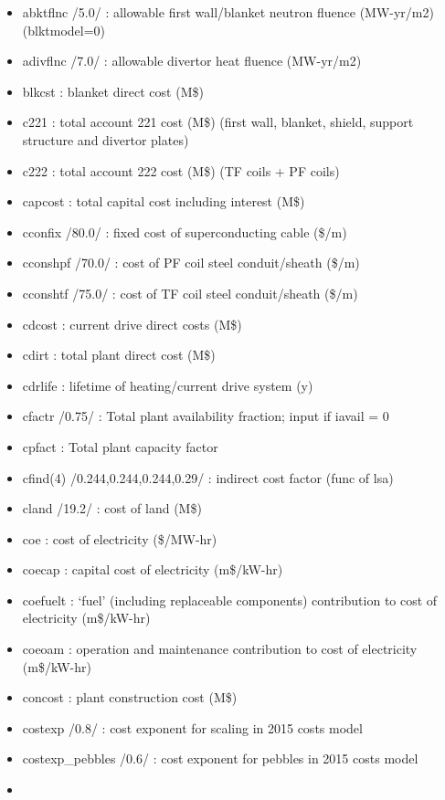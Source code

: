 \documentclass[]{article}
\begin{document}
\begin{itemize}
\itemsep1pt\parskip0pt
\item
  abktflnc /5.0/ : allowable first wall/blanket neutron fluence
  (MW-yr/m2) (blktmodel=0)
\item
  adivflnc /7.0/ : allowable divertor heat fluence (MW-yr/m2)
\item
  blkcst : blanket direct cost (M\$)
\item
  c221 : total account 221 cost (M\$) (first wall, blanket, shield,
  support structure and divertor plates)
\item
  c222 : total account 222 cost (M\$) (TF coils + PF coils)
\item
  capcost : total capital cost including interest (M\$)
\item
  cconfix /80.0/ : fixed cost of superconducting cable (\$/m)
\item
  cconshpf /70.0/ : cost of PF coil steel conduit/sheath (\$/m)
\item
  cconshtf /75.0/ : cost of TF coil steel conduit/sheath (\$/m)
\item
  cdcost : current drive direct costs (M\$)
\item
  cdirt : total plant direct cost (M\$)
\item
  cdrlife : lifetime of heating/current drive system (y)
\item
  cfactr /0.75/ : Total plant availability fraction; input if iavail = 0
\item
  cpfact : Total plant capacity factor
\item
  cfind(4) /0.244,0.244,0.244,0.29/ : indirect cost factor (func of lsa)
\item
  cland /19.2/ : cost of land (M\$)
\item
  coe : cost of electricity (\$/MW-hr)
\item
  coecap : capital cost of electricity (m\$/kW-hr)
\item
  coefuelt : `fuel' (including replaceable components) contribution to
  cost of electricity (m\$/kW-hr)
\item
  coeoam : operation and maintenance contribution to cost of electricity
  (m\$/kW-hr)
\item
  concost : plant construction cost (M\$)
\item
  costexp /0.8/ : cost exponent for scaling in 2015 costs model
\item
  costexp\_pebbles /0.6/ : cost exponent for pebbles in 2015 costs model
\item

\end{itemize}
\end{document}
